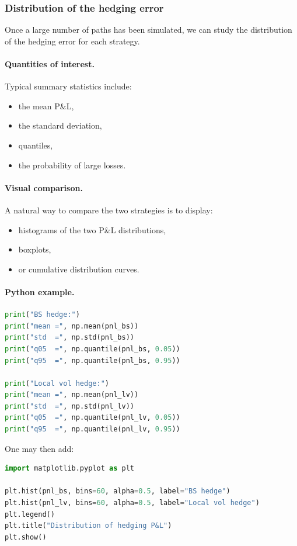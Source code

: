 \documentclass[11pt]{article}
\theoremstyle{plain}
\theoremstyle{definition}
\theoremstyle{remark}
\begin{document}
\subsubsection{Distribution of the hedging error}

Once a large number of paths has been simulated, we can study the
distribution of the hedging error for each strategy.

\paragraph{Quantities of interest.}
Typical summary statistics include:
\begin{itemize}[leftmargin=1.4em]
    \item the mean P\&L,
    \item the standard deviation,
    \item quantiles,
    \item the probability of large losses.
\end{itemize}

\paragraph{Visual comparison.}
A natural way to compare the two strategies is to display:
\begin{itemize}[leftmargin=1.4em]
    \item histograms of the two P\&L distributions,
    \item boxplots,
    \item or cumulative distribution curves.
\end{itemize}

\paragraph{Python example.}
\begin{lstlisting}[language=Python]
print("BS hedge:")
print("mean =", np.mean(pnl_bs))
print("std  =", np.std(pnl_bs))
print("q05  =", np.quantile(pnl_bs, 0.05))
print("q95  =", np.quantile(pnl_bs, 0.95))

print("Local vol hedge:")
print("mean =", np.mean(pnl_lv))
print("std  =", np.std(pnl_lv))
print("q05  =", np.quantile(pnl_lv, 0.05))
print("q95  =", np.quantile(pnl_lv, 0.95))
\end{lstlisting}

One may then add:
\begin{lstlisting}[language=Python]
import matplotlib.pyplot as plt

plt.hist(pnl_bs, bins=60, alpha=0.5, label="BS hedge")
plt.hist(pnl_lv, bins=60, alpha=0.5, label="Local vol hedge")
plt.legend()
plt.title("Distribution of hedging P&L")
plt.show()
\end{lstlisting}
\end{document}
